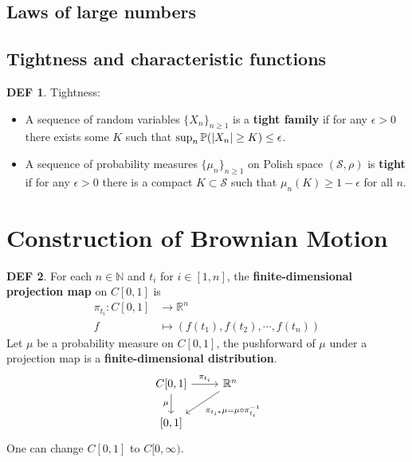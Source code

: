 \documentclass[hidelinks,11pt]{article}
\theoremstyle{definition}
\newtheorem*{defin}{DEF}
\theoremstyle{dotless}
\theoremstyle{remark}
\DeclareMathOperator{\1}{\mathbf{1}}
\begin{document}
\subsection{Laws of large numbers}

\subsection{Tightness and characteristic functions}

\begin{defin}Tightness:\begin{itemize}
    \item A sequence of random variables $\{X_n\}_{n\geq1}$ is a \textbf{tight family} if for any $\epsilon>0$ there exists some $K$ such that $\sup_n\mathbb{P}(\abs{X_n}\geq K)\leq\epsilon$.
    \item A sequence of probability measures $\{\mu_n\}_{n\geq1}$ on Polish space $(\mathcal{S},\rho)$ is \textbf{tight} if for any $\epsilon>0$ there is a compact $K\subset\mathcal{S}$ such that $\mu_n(K)\geq1-\epsilon$ for all $n$.
\end{itemize}
\end{defin}

\section{Construction of Brownian Motion}

\begin{defin}
For each $n\in\mathbb{N}$ and $t_i$ for $i\in[1,n]$, the \textbf{finite-dimensional projection map} on $C[0,1]$ is
\begin{align*}
    \pi_{t_i}:C[0,1]&\to\mathbb{R}^n\\
    f&\mapsto(f(t_1),f(t_2),\cdots,f(t_n))
\end{align*}
Let $\mu$ be a probability measure on $C[0,1]$, the pushforward of $\mu$ under a projection map is a \textbf{finite-dimensional distribution}.
\[\begin{tikzcd}
{C[0,1]} \arrow[d, "\mu"'] \arrow[r, "\pi_{t_i}"] & \mathbb{R}^n \arrow[ld, "\pi_{t_i\ast}\mu=\mu\circ\pi_{t_i}^{-1}"] \\
{[0,1]}                                           &                                                                   
\end{tikzcd}\]
One can change $C[0,1]$ to $C[0,\infty)$.
\end{defin}
\end{document}

